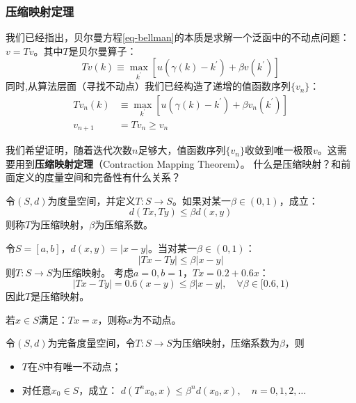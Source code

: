 \subsubsection{压缩映射定理}

我们已经指出，贝尔曼方程\ref{eq-bellman}的本质是求解一个泛函中的不动点问题：$v=Tv$。其中$T$是贝尔曼算子：
$$
Tv\left(k\right) \equiv \max_{k^{\prime}} \left[u\left(\gamma\left(k\right)-k^{\prime}\right)+\beta v\left(k^{\prime}\right)\right]
$$
同时,从算法层面（寻找不动点）我们已经构造了递增的值函数序列$\{v_n\}$：
\begin{equation*}
    \begin{aligned}
        Tv_n\left(k\right) &\equiv \max _{k^{\prime}} \left[u\left(\gamma\left(k\right)-k^{\prime}\right)+\beta v_n\left(k^{\prime}\right)\right] \\
        v_{n+1} &= Tv_n \geq v_n
    \end{aligned}
\end{equation*}

我们希望证明，随着迭代次数$n$足够大，值函数序列$\{v_n\}$收敛到唯一极限$v$。这需要用到\textbf{压缩映射定理}（Contraction Mapping Theorem）。
什么是压缩映射？和前面定义的度量空间和完备性有什么关系？

\begin{definition}
    令$\left(S,d\right)$为度量空间，并定义$T:S\rightarrow S$。如果对某一$\beta \in \left(0,1\right)$，成立：
    $$
    d\left(Tx,Ty\right) \leq \beta d\left(x,y\right)
    $$
    则称$T$为压缩映射，$\beta$为压缩系数。
\end{definition}
\begin{example}
    令$S=\left[a,b\right]$，$d\left(x,y\right)=\left|x-y\right|$。当对某一$\beta \in \left(0,1\right)$：
    $$\left|Tx-Ty\right|\leq \beta \left|x-y\right|$$
    则$T:S\rightarrow S$为压缩映射。
    考虑$a=0,b=1$，$Tx=0.2+0.6x$：
    $$\left|Tx-Ty\right|=0.6\left(x-y\right)\leq \beta\left|x-y\right|,\quad \forall \beta \in [0.6,1)$$
    因此$T$是压缩映射。
\end{example}

\begin{definition}
    若$x \in S$满足：$Tx=x$，则称$x$为不动点。
\end{definition}

\begin{theorem}   \label{th-cmt}
    令$\left(S,d\right)$为完备度量空间，令$T:S\rightarrow S$为压缩映射，压缩系数为$\beta$，则
    \begin{itemize}
        \item $T$在$S$中有唯一不动点；
        \item 对任意$x_0 \in S$，成立：
            $d\left(T^nx_0, x\right) \leq \beta^n d\left(x_0,x\right), \quad n=0,1,2,\dots$
    \end{itemize}
\end{theorem}

